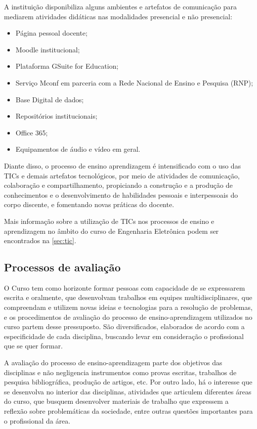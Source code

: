 A instituição disponibiliza alguns ambientes e artefatos de comunicação para mediarem atividades didáticas nas modalidades presencial e não presencial:

\begin{itemize}
    \item Página pessoal docente;
    \item Moodle institucional;
    \item Plataforma GSuite for Education;
    \item Serviço Mconf em parceria com a Rede Nacional de Ensino e Pesquisa (RNP);
    \item Base Digital de dados;
    \item Repositórios institucionais;
    \item Office 365;
    \item Equipamentos de áudio e vídeo em geral.
\end{itemize}
    
Diante disso, o processo de ensino aprendizagem é intensificado com o uso das TICs e demais artefatos tecnológicos, por meio de atividades de comunicação, colaboração e compartilhamento, propiciando a construção e a produção de conhecimentos e o desenvolvimento de habilidades pessoais e interpessoais do corpo discente, e fomentando novas práticas do docente.

Mais informação sobre a utilização de TICs nos processos de ensino e aprendizagem no âmbito do curso de Engenharia Eletrônica podem ser encontrados na \autoref{sec:tic}.

\subsection{Processos de avaliação}

O Curso tem como horizonte formar pessoas com capacidade de se expressarem escrita e oralmente, que desenvolvam trabalhos em equipes multidisciplinares, que compreendam e utilizem novas ideias e tecnologias para a resolução de problemas, e os procedimentos de avaliação do processo de ensino-aprendizagem utilizados no curso partem desse pressuposto. São diversificados, elaborados de acordo com a especificidade de cada disciplina, buscando levar em consideração o profissional que se quer formar.

A avaliação do processo de ensino-aprendizagem parte dos objetivos das disciplinas e não negligencia instrumentos como provas escritas, trabalhos de pesquisa bibliográfica, produção de artigos, etc. Por outro lado, há o interesse que se desenvolva no interior das disciplinas, atividades que articulem diferentes áreas do curso, que busquem desenvolver materiais de trabalho que expressem a reflexão sobre problemáticas da sociedade, entre outras questões importantes para o profissional da área.

